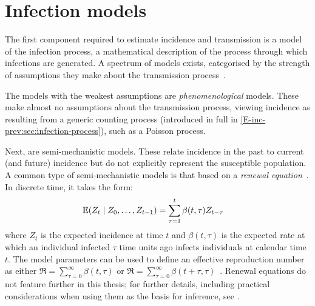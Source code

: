 \documentclass[thesis.tex]{subfiles}
\begin{document}
\section{Infection models}

The first component required to estimate incidence and transmission is a model of the infection process, a mathematical description of the process through which infections are generated.
A spectrum of models exists, categorised by the strength of assumptions they make about the transmission process~\autocite{beckerCOVIDmodels}.

The models with the weakest assumptions are \emph{phenomenological} models.
These make almost no assumptions about the transmission process, viewing incidence as resulting from a generic counting process (introduced in full in \cref{E-inc-prev:sec:infection-process}), such as a Poisson process.

Next, are semi-mechanistic models.
These relate incidence in the past to current (and future) incidence but do not explicitly represent the susceptible population.
A common type of semi-mechanistic models is that based on a \emph{renewal equation}~\autocite{bhattSemimechanistic,fraserRenewal}.
In discrete time, it takes the form:
\begin{align}
    \operatorname{\mathbb{E}}(Z_t \mid Z_0, \dots, Z_{t-1}) &= \sum_{\tau=1}^t \beta(t,\tau) Z_{t-\tau}
    \label{intro:eq:renewal}
\end{align}
where $Z_t$ is the expected incidence at time $t$ and $\beta(t, \tau)$ is the expected rate at which an individual infected $\tau$ time units ago infects individuals at calendar time $t$.
The model parameters can be used to define an effective reproduction number as either $\Re = \sum_{\tau=0}^\infty \beta(t, \tau)$ or $\Re = \sum_{\tau=0}^\infty \beta(t+\tau, \tau)$~\autocite{gosticPractical}.
Renewal equations do not feature further in this thesis; for further details, including practical considerations when using them as the basis for inference, see \textcite{thompsonImproved,gosticPractical}.
\end{document}

